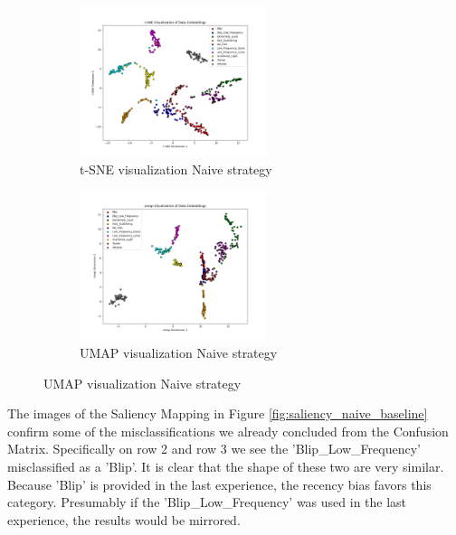 \newpage
\begin{figure}[ht]
\centering
\begin{subfigure}
  \centering
    \includegraphics[width=0.6\textwidth]{Images/tSNE_MultiView_Naive_testset_100epochs.png}
    \caption{t-SNE visualization Naive strategy}
    \label{fig:tSNE_Naive}
\end{subfigure}
\begin{subfigure}
  \centering
    \includegraphics[width=0.6\textwidth]{Images/umap_MultiView_Naive_testset_100epochs.png}
    \caption{UMAP visualization Naive strategy}
    \label{fig:umap_Naive}
\end{subfigure}
\end{figure}

The images of the Saliency Mapping in Figure \ref{fig:saliency_naive_baseline} confirm some of the misclassifications we already concluded from the Confusion Matrix. Specifically on row 2 and row 3 we see the 'Blip\_Low\_Frequency' misclassified as a 'Blip'. It is clear that the shape of these two are very similar. 
Because 'Blip' is provided in the last experience, the recency bias favors this category. Presumably if the 'Blip\_Low\_Frequency' was used in the last experience, the results would be mirrored. 

